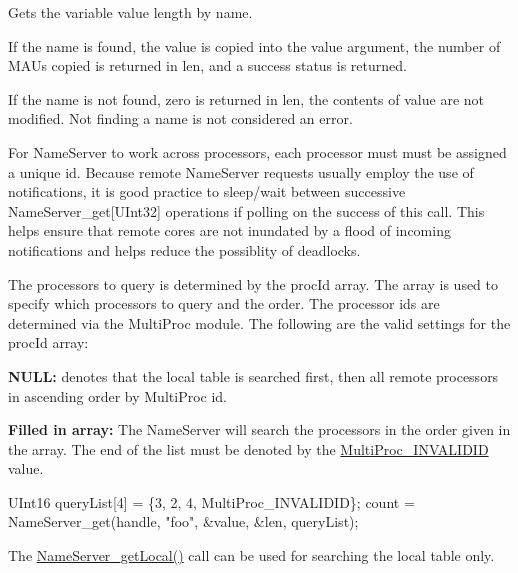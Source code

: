 Gets the variable value length by name. 

If the name is found, the value is copied into the value argument, the number of M\-A\-Us copied is returned in len, and a success status is returned.

If the name is not found, zero is returned in len, the contents of value are not modified. Not finding a name is not considered an error.

For Name\-Server to work across processors, each processor must must be assigned a unique id. Because remote Name\-Server requests usually employ the use of notifications, it is good practice to sleep/wait between successive Name\-Server\-\_\-get\mbox{[}U\-Int32\mbox{]} operations if polling on the success of this call. This helps ensure that remote cores are not inundated by a flood of incoming notifications and helps reduce the possiblity of deadlocks.

The processors to query is determined by the proc\-Id array. The array is used to specify which processors to query and the order. The processor ids are determined via the Multi\-Proc module. The following are the valid settings for the proc\-Id array\-: \begin{DoxyItemize}
\item {\bfseries N\-U\-L\-L\-:} denotes that the local table is searched first, then all remote processors in ascending order by Multi\-Proc id. \item {\bfseries Filled in array\-:} The Name\-Server will search the processors in the order given in the array. The end of the list must be denoted by the \hyperlink{_multi_proc_8h_a94a1d14527833bc8294407634d5495d9}{Multi\-Proc\-\_\-\-I\-N\-V\-A\-L\-I\-D\-I\-D} value.\end{DoxyItemize}

\begin{DoxyCode}
    UInt16 queryList[4] = \{3, 2, 4, MultiProc_INVALIDID\};
    count = NameServer_get(handle, \textcolor{stringliteral}{"foo"}, &value, &len, queryList);
\end{DoxyCode}


The \hyperlink{_name_server_8h_a46d3826bc4ef4bc6cc45d5287c697122}{Name\-Server\-\_\-get\-Local()} call can be used for searching the local table only.


